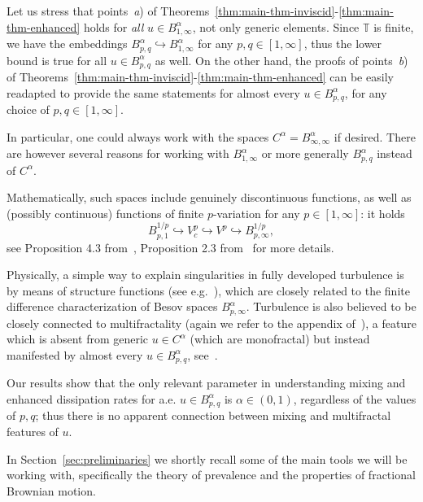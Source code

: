 \documentclass[11pt,oneside,reqno]{amsart}
\newcommand{\tmtextbf}[1]{\text{{\bfseries{#1}}}}
\newcommand{\tmtextit}[1]{{{\itshape{#1}}}}
\numberwithin{equation}{section}
\begin{document}
\begin{remark}
  \label{rem:intro}Let us stress that points~\tmtextit{a}) of
  Theorems~\ref{thm:main-thm-inviscid}-\ref{thm:main-thm-enhanced} holds for
  \tmtextit{all} $u \in B^{\alpha}_{1, \infty}$, not only generic elements.
  Since $\mathbb{T}$ is finite, we have the embeddings $B^{\alpha}_{p, q}
  \hookrightarrow B^{\alpha}_{1, \infty}$ for any $p, q \in [1, \infty]$, thus
  the lower bound is true for all $u \in B^{\alpha}_{p, q}$ as well. On the
  other hand, the proofs of points~\tmtextit{b}) of
  Theorems~\ref{thm:main-thm-inviscid}-\ref{thm:main-thm-enhanced} can be
  easily readapted to provide the same statements for almost every $u \in
  B^{\alpha}_{p, q}$, for any choice of $p, q \in [1, \infty]$.
  
  In particular, one could always work with the spaces $C^{\alpha} =
  B^{\alpha}_{\infty, \infty}$ if desired. There are however several reasons
  for working with $B^{\alpha}_{1, \infty}$ or more generally $B^{\alpha}_{p,
  q}$ instead of $C^{\alpha}$.
  
  Mathematically, such spaces include genuinely discontinuous functions, as
  well as (possibly continuous) functions of finite $p$-variation for any $p
  \in [1, \infty]$: it holds
  \[ B^{1 / p}_{p, 1} \hookrightarrow V^p_c \hookrightarrow V^p
     \hookrightarrow B^{1 / p}_{p, \infty}, \]
  see Proposition 4.3 from~{\cite{liu2020}}, Proposition 2.3
  from~{\cite{friz2021}} for more details.
  
  Physically, a simple way to explain singularities in fully developed
  turbulence is by means of structure functions (see
  e.g.~{\cite{frisch1980}}), which are closely related to the finite
  difference characterization of Besov spaces $B^{\alpha}_{p, \infty}$.
  Turbulence is also believed to be closely connected to multifractality
  (again we refer to the appendix of~{\cite{frisch1980}}), a feature which is
  absent from generic $u \in C^{\alpha}$ (which are monofractal) but instead
  manifested by almost every $u \in B^{\alpha}_{p, q}$,
  see~{\cite{jaffard2000,fraysse2006,fraysse2010}}.
  
  Our results show that the only relevant parameter in understanding mixing
  and enhanced dissipation rates for a.e. $u \in B^{\alpha}_{p, q}$ is $\alpha
  \in (0, 1)$, regardless of the values of $p, q$; thus there is no apparent
  connection between mixing and multifractal features of $u$.
\end{remark}

\tmtextbf{Structure of the paper.} In Section~\ref{sec:preliminaries} we
shortly recall some of the main tools we will be working with, specifically
the theory of prevalence and the properties of fractional Brownian motion.
\end{document}
